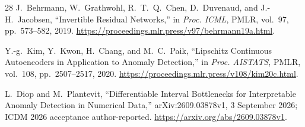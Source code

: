 \begin{thebibliography}{28}
J.~Behrmann, W.~Grathwohl, R.~T.~Q.~Chen, D.~Duvenaud, and J.-H.~Jacobsen,
``Invertible Residual Networks,'' in \emph{Proc. ICML},
PMLR, vol.~97, pp.~573--582, 2019.
\url{https://proceedings.mlr.press/v97/behrmann19a.html}.

Y.-g.~Kim, Y.~Kwon, H.~Chang, and M.~C.~Paik,
``Lipschitz Continuous Autoencoders in Application to Anomaly Detection,''
in \emph{Proc. AISTATS}, PMLR, vol.~108, pp.~2507--2517, 2020.
\url{https://proceedings.mlr.press/v108/kim20c.html}.

L.~Diop and M.~Plantevit,
``Differentiable Interval Bottlenecks for Interpretable Anomaly Detection in Numerical Data,''
arXiv:2609.03878v1, 3 September 2026; ICDM 2026 acceptance author-reported.
\url{https://arxiv.org/abs/2609.03878v1}.

\end{thebibliography}
